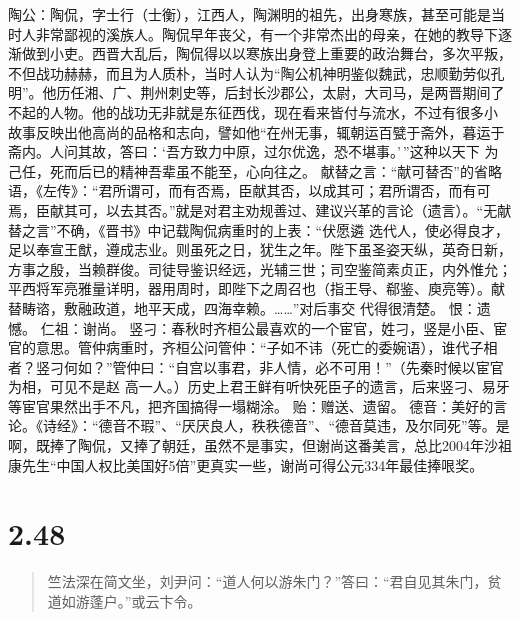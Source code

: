 \documentclass[]{book}
\begin{document}
陶公：陶侃，字士行（士衡），江西人，陶渊明的祖先，出身寒族，甚至可能是当时人非常鄙视的溪族人。陶侃早年丧父，有一个非常杰出的母亲，在她的教导下逐渐做到小吏。西晋大乱后，陶侃得以以寒族出身登上重要的政治舞台，多次平叛，不但战功赫赫，而且为人质朴，当时人认为``陶公机神明鉴似魏武，忠顺勤劳似孔明''。他历任湘、广、荆州刺史等，后封长沙郡公，太尉，大司马，是两晋期间了不起的人物。他的战功无非就是东征西伐，现在看来皆付与流水，不过有很多小
故事反映出他高尚的品格和志向，譬如他``在州无事，辄朝运百甓于斋外，暮运于斋内。人问其故，答曰：`吾方致力中原，过尔优逸，恐不堪事。'\,''这种以天下
为己任，死而后已的精神吾辈虽不能至，心向往之。
献替之言：``献可替否''的省略语，《左传》：``君所谓可，而有否焉，臣献其否，以成其可；君所谓否，而有可焉，臣献其可，以去其否。''就是对君主劝规善过、建议兴革的言论（遗言）。``无献替之言''不确，《晋书》中记载陶侃病重时的上表：``伏愿遴
选代人，使必得良才，足以奉宣王猷，遵成志业。则虽死之日，犹生之年。陛下虽圣姿天纵，英奇日新，方事之殷，当赖群俊。司徒导鉴识经远，光辅三世；司空鉴简素贞正，内外惟允；平西将军亮雅量详明，器用周时，即陛下之周召也（指王导、郗鉴、庾亮等）。献替畴谘，敷融政道，地平天成，四海幸赖。\ldots{}\ldots{}''对后事交
代得很清楚。 恨：遗憾。 仁祖：谢尚。
竖刁：春秋时齐桓公最喜欢的一个宦官，姓刁，竖是小臣、宦官的意思。管仲病重时，齐桓公问管仲：``子如不讳（死亡的委婉语），谁代子相者？竖刁何如？''管仲曰：``自宫以事君，非人情，必不可用！''（先秦时候以宦官为相，可见不是赵
高一人。）历史上君王鲜有听快死臣子的遗言，后来竖刁、易牙等宦官果然出手不凡，把齐国搞得一塌糊涂。
贻：赠送、遗留。
德音：美好的言论。《诗经》：``德音不瑕''、``厌厌良人，秩秩德音''、``德音莫违，及尔同死''等。是啊，既捧了陶侃，又捧了朝廷，虽然不是事实，但谢尚这番美言，总比2004年沙祖康先生``中国人权比美国好5倍''更真实一些，谢尚可得公元334年最佳捧哏奖。

\section{2.48}\label{section-94}

\begin{quote}
竺法深在简文坐，刘尹问：``道人何以游朱门？''答曰：``君自见其朱门，贫道如游蓬户。''或云卞令。
\end{quote}
\end{document}
